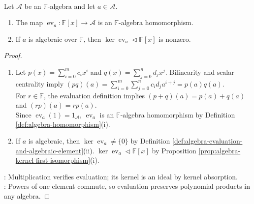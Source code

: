 \begin{proposition} \label{prop:algebra-evaluation-homomorphism} \\
Let $\mathcal{A}$ be an $\mathbb{F}$-algebra and let $a\in\mathcal{A}$.
\begin{enumerate}[label=(\roman*)]
\setlength{\itemsep}{0pt}
\item The map $\operatorname{ev}_a:\mathbb{F}[x]\to\mathcal{A}$ is an $\mathbb{F}$-algebra homomorphism.
\item If $a$ is algebraic over $\mathbb{F}$, then $\ker\operatorname{ev}_a\triangleleft\mathbb{F}[x]$ is nonzero.
\end{enumerate}
\begin{proof}
\begin{enumerate}[label=(\roman*)]
\setlength{\itemsep}{0pt}
\item[$(i)$] Let $p(x)=\sum\limits_{i=0}^{m}c_ix^i$ and $q(x)=\sum\limits_{j=0}^{n}d_jx^j$. Bilinearity and scalar centrality imply $(pq)(a)=\sum\limits_{i=0}^{m}\sum\limits_{j=0}^{n}c_id_ja^{i+j}=p(a)q(a)$.\\
For $r\in\mathbb{F}$, the evaluation definition implies $(p+q)(a)=p(a)+q(a)$ and $(rp)(a)=rp(a)$.\\
Since $\operatorname{ev}_a(1)=1_{\mathcal{A}}$, $\operatorname{ev}_a$ is an $\mathbb{F}$-algebra homomorphism by Definition \ref{def:algebra-homomorphism}(i).
\item[$(ii)$] If $a$ is algebraic, then $\ker\operatorname{ev}_a\neq\{0\}$ by Definition \ref{def:algebra-evaluation-and-algebraic-element}(ii). $\ker\operatorname{ev}_a\triangleleft\mathbb{F}[x]$ by Proposition \ref{prop:algebra-kernel-first-isomorphism}(i).
\end{enumerate}
: Multiplication verifies evaluation; its kernel is an ideal by kernel absorption.\\
: Powers of one element commute, so evaluation preserves polynomial products in any algebra.
\end{proof}
\end{proposition}


